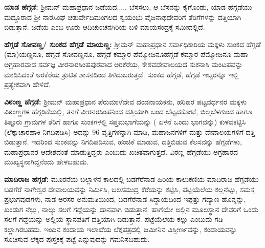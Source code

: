 \vskip 2pt

\textbf{ಯಾಡ ಹೆಗ್ಗಡೆ:} ಶ‍್ರೀಮನ್​ ಮಹಾಪ್ರಧಾನ ಜಡೆಯದ..... ಬೆಸಸಲು, ಆ ಬೆಸನನ್ನು ಕೈಗೊಂಡು, ಯಾಡ ಹೆಗ್ಗಡೆಯು ಮದ್ದೂರಾದ ಶ‍್ರೀ ನಾರಸಿಂಘ ಚತುರ್ವೇದಿಮಂಗಲದ ಸ್ವಯಂಭು ವೈಜನಾಥದೇವರಿಗೆ ತೆರಿಗೆಗಳನ್ನು ದತ್ತಿಯಾಗಿ ಬಿಡುತ್ತಾನೆ. ಜಡೆಯ ಎಂಬ ಊರು ಆದಿಚುಂಚನಗಿರಿಯ ಬಳಿ ಮಾಯಸಂದ್ರಕ್ಕೆ ಸಮೀದಲ್ಲಿದೆ.

\vskip 2pt

\textbf{ಹೆಗ್ಗಡೆ ಸೋವಣ್ಣ/ ಸುಂಕದ ಹೆಗ್ಗಡೆ ಮಾಯಣ್ಣ:} ಶ‍್ರೀಮನ್​ ಮಹಾಪ್ರಧಾನ ಸರ್ವಾಧಿಕಾರಿಯ ಮಕ್ಕಳು ಸುಂಕದ ಹೆಗ್ಗಡೆ (ಮಾ)ಯಣ್ಣನೂ, ಹೆಗ್ಗಡೆ ಸೋವಣ್ಣನೂ, ಹೆಗ್ಗಡೆ ಕಮ್ಮಾರ ಪೆಮ್ಮೋಜನೂಹೆಗ್ಗಡೆ ಕಮ್ಮಾರ ಪೆಮ್ಮೋಜನೂ ಮಹಾ ಅಗ್ರಹಾರವಾದ ಸರ್ವಜ್ಞ ವೀರನಾರಸಿಂಹಪುರ\-ವಾದ ಅರಕೆರೆಯ, ಕೇಶವದೇವಾಲಯದ ಸುಕನಾಸಿ ಮಂಟಪವನ್ನು ಮಾಡಿಸಿದಂತೆ ಅರಕೆರೆಯ ತ್ರುಟಿತ ಶಾಸನದಿಂದ ತಿಳಿದುಬರುತ್ತದೆ. ಸುಂಕದ ಹೆಗ್ಗಡೆ, ಹೆಗ್ಗಡೆ ಇಬ್ಬರನ್ನೂ ಇಲ್ಲಿ ಪ್ರತ್ಯೇಕವಾಗಿ ಹೇಳಿದೆ.

\vskip 2pt

\textbf{ವಿಠಂಣ್ಣ ಹೆಗ್ಗಡೆ:} ಶ‍್ರೀಮನ್​ ಮಹಾಪ್ರಧಾನ ಪೆರುಮಾಳೆದೇವ ದಂಡನಾಯಕನು, ಹರಿಹರ ಪಟ್ಟವರ್ಧನರ ಮಕ್ಕಳು ವಿಠಂಣ್ಣಗಳ ಹೆಗ್ಗಡಿಕೆಯಲ್ಲಿ, ತನಗೆ ವೀರನರಸಿಂಹನಿಂದ ದತ್ತಿಯಾಗಿ ಬಂದ ಬೆಟ್ಟದಕೋಟೆ, ಬಿಲ್ಲಬೆಳಗುಂದ ಹಾಗೂ ತಿಪ್ಪೂರು ಗ್ರಾಮಗಳ ತೆರಿಗೆ ಹಾಗೂ ಸುಂಕಗಳಲ್ಲಿ ಸಪ್ತಮಭಾಗೆಯನ್ನು ( ಏಳನೆ ಒಂದು ಭಾಗವನ್ನು) ಕುಳವಕಟ್ಟಿಸಿ (ಲೆಕ್ಕಾಚಾರಹಾಕಿ ನಿಗದಿಪಡಿಸಿ) ಅದನ್ನು 96 ವೃತ್ತಿಗಳನ್ನಾಗಿ ಮಾಡಿ, ಮಹಾಜನಗಳಿಗೆ ಮತ್ತು ದೇವಾಲಯಗಳಿಗೆ ದತ್ತಿ ಬಿಡುತ್ತಾನೆ. ಇದರಿಂದ ಸುಂಕವನ್ನು ನಿಗದಿಪಡಿಸುವ, ಹಂಚಿಕೆ ಮಾಡುವ, ದತ್ತಿಬಿಡುವ ಕೆಲಸವನ್ನು ಹೆಗ್ಗಡೆಗಳು, ಮಹಾಪ್ರಧಾನರ ಆದೇಶದಂತೆ ಮಾಡುತ್ತಿದ್ದರು ಎಂಬುದು ಖಚಿತವಾಗುತ್ತದೆ. ವಿಠಣ್ಣ ಹೆಗ್ಗಡೆಯು ಅಗ್ರಹಾರದ ಮುಖ್ಯಸ್ಥ\-ನಾಗಿದ್ದನೆಂದು ಹೇಳಬಹುದು.

\vskip 2pt

\textbf{ಮಾದಿರಾಜ ಹೆಗ್ಗಡೆ:} ಮೂರನೆಯ ಬಲ್ಲಾಳನ ಕಾಲದಲ್ಲಿ ಬಡಗೆರೆನಾಡ ಹಿರಿಯ ಕಾಲುಕಣಿಯ ಮಾದಿರಾಜ ಹೆಗ್ಗಡೆಯು ಬಡಗೆರೆ ನಾಗೇಶ್ವರ ದೇವಾಲಯವನ್ನು ನಿರ್ಮಿಸಿ, ಬಲಸಮುದ್ರ ಕೆರೆಯನ್ನು ಕಟ್ಟಿಸಿ, ಪಟ್ಟಯೆಲೆಯ ಕಲ್ಲನೆಟ್ಟು, ಸಮಸ್ತ ಪ್ರಭುಗವುಡಗಳು, ನಾಡ ಅರಸರ ಅನುಮತಿಯಿಂದ, ಬಡಗೆರೆನಾಡ ಸಿದ್ಧಾಯದಿಂದ ಇಪ್ಪತ್ತು ಗದ್ಯಾಣ ಹೊನ್ನನ್ನು, ಖಂಡುಗ ನೆಲ್ಲು, ನಾಲ್ಕು ಸಲಗೆ ಗದ್ದೆಯನ್ನು ದಾನವಾಗಿ ಬಿಡುತ್ತಾನೆ. ಹಾಗೆಯೇ ಅಲ್ಲಿನ ಮೂಲಸ್ಥಾನ ದೇವರಿಗೆ ಒಂದು ಸಲಗೆ ಗದ್ದೆಯನ್ನು ಅಲ್ಲಿಯ ಸ್ಥಾನಪತಿಗೆ ದತ್ತಿಯಾಗಿ ಬಿಡುತ್ತಾನೆ. ಪಟ್ಟೆಯೆಲೆಯ ಕಲ್ಲು ಎಂಬುದು ಗಡಿ ಕಲ್ಲಾಗಿರಬಹದು. ಇಂದಿನ ಕಂದಾಯ ಇಲಾಖೆಯ ಲೆಕ್ಕಪತ್ರದಲ್ಲಿ ಜಮೀನಿನ ವಿಸ್ತೀರ್ಣವನ್ನು, ಕಂದಾಯವನ್ನು ಸೂಚಿಸುವ ಲೆಕ್ಕದ ಪುಸ್ತಕಕ್ಕೆ ಪಟ್ಟೆ ಎನ್ನುವುದನ್ನು ಗಮನಿಸಬಹುದು.

